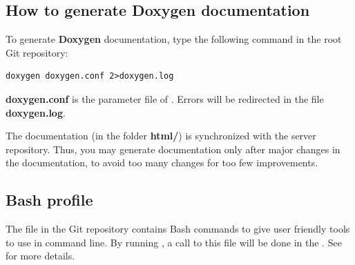 \documentclass[english,a4paper,twoside]{article}
\begin{document}
\subsection{How to generate Doxygen documentation}
To generate \textbf{Doxygen} documentation, type the following command in the root Git repository:
\begin{verbatim}
doxygen doxygen.conf 2>doxygen.log
\end{verbatim}

\textbf{doxygen.conf} is the parameter file of . Errors will be redirected in the file \textbf{doxygen.log}.

\begin{attention}
The documentation (in the folder \textbf{html/}) is synchronized with the server repository. Thus, you may generate documentation only after major changes in the  documentation, to avoid too many changes for too few improvements.
\end{attention}


\subsection{Bash profile}
The file  in the Git repository contains Bash commands to give user friendly tools to use  in command line. By running , a call to this file will be done in the . See  for more details.



\printindex
\end{document}

